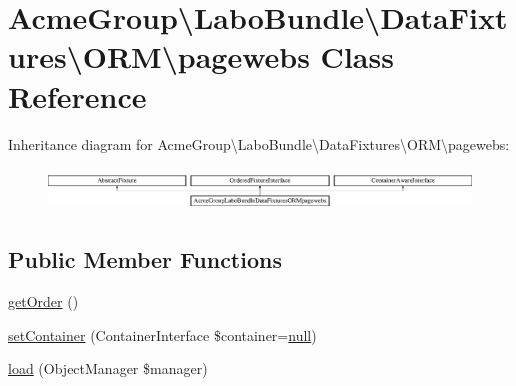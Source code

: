 \hypertarget{class_acme_group_1_1_labo_bundle_1_1_data_fixtures_1_1_o_r_m_1_1pagewebs}{\section{Acme\+Group\textbackslash{}Labo\+Bundle\textbackslash{}Data\+Fixtures\textbackslash{}O\+R\+M\textbackslash{}pagewebs Class Reference}
\label{class_acme_group_1_1_labo_bundle_1_1_data_fixtures_1_1_o_r_m_1_1pagewebs}
}
Inheritance diagram for Acme\+Group\textbackslash{}Labo\+Bundle\textbackslash{}Data\+Fixtures\textbackslash{}O\+R\+M\textbackslash{}pagewebs\+:\begin{figure}[H]
\begin{center}
\leavevmode
\includegraphics[height=1.141692cm]{class_acme_group_1_1_labo_bundle_1_1_data_fixtures_1_1_o_r_m_1_1pagewebs}
\end{center}
\end{figure}
\subsection*{Public Member Functions}
\begin{DoxyCompactItemize}
\item 
\hyperlink{class_acme_group_1_1_labo_bundle_1_1_data_fixtures_1_1_o_r_m_1_1pagewebs_a154ebe27abaaf8dc9d17f815846a577f}{get\+Order} ()
\item 
\hyperlink{class_acme_group_1_1_labo_bundle_1_1_data_fixtures_1_1_o_r_m_1_1pagewebs_ac83508af1b27b7a17b3ea36056f2b537}{set\+Container} (Container\+Interface \$container=\hyperlink{validate_8js_afb8e110345c45e74478894341ab6b28e}{null})
\item 
\hyperlink{class_acme_group_1_1_labo_bundle_1_1_data_fixtures_1_1_o_r_m_1_1pagewebs_ae273e80da589c7ad3d75395455bd6b45}{load} (Object\+Manager \$manager)
\end{DoxyCompactItemize}



